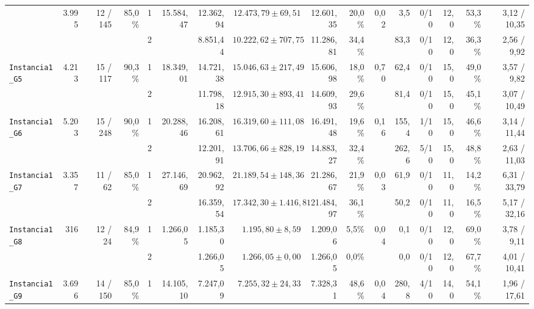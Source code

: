 {\begin{longtable}{lrrrcrrrrrrrrrrr}
\midrule
\rowcolor{gray!18}\multirow{2}{*}{\textbf{\texttt{Instancia1\_G4}}} & \multirow{2}{*}{3.995} & \multirow{2}{*}{12 / 145} & \multirow{2}{*}{85,0\%} & 1 & \multirow{2}{*}{15.584,47} & 12.362,94 & $12.473,79 \pm 69,51$ & 12.601,35 & 20,0\% & \multirow{2}{*}{0,02} & 3,5 & 0/10 & 12,0 & 53,3\% & 3,12 / 10,35 \\
\rowcolor{gray!18}& & & & 2 &  & 8.851,44 & $10.222,62 \pm 707,75$ & 11.286,81 & 34,4\% &  & 83,3 & 0/10 & 12,0 & 36,3\% & 2,56 / 9,92 \\
\midrule
\multirow{2}{*}{\texttt{Instancia1\_G5}} & \multirow{2}{*}{4.213} & \multirow{2}{*}{15 / 117} & \multirow{2}{*}{90,3\%} & 1 & \multirow{2}{*}{18.349,01} & 14.721,38 & $15.046,63 \pm 217,49$ & 15.606,98 & 18,0\% & \multirow{2}{*}{0,70} & 62,4 & 0/10 & 15,0 & 49,0\% & 3,57 / 9,82 \\
& & & & 2 &  & 11.798,18 & $12.915,30 \pm 893,41$ & 14.609,93 & 29,6\% &  & 81,4 & 0/10 & 15,0 & 45,1\% & 3,07 / 10,49 \\
\midrule
\multirow{2}{*}{\texttt{Instancia1\_G6}} & \multirow{2}{*}{5.203} & \multirow{2}{*}{15 / 248} & \multirow{2}{*}{90,0\%} & 1 & \multirow{2}{*}{20.288,46} & 16.208,61 & $16.319,60 \pm 111,08$ & 16.491,48 & 19,6\% & \multirow{2}{*}{0,16} & 155,4 & 1/10 & 15,0 & 46,6\% & 3,14 / 11,44 \\
& & & & 2 &  & 12.201,91 & $13.706,66 \pm 828,19$ & 14.883,27 & 32,4\% &  & 262,6 & 5/10 & 15,0 & 48,8\% & 2,63 / 11,03 \\
\midrule
\multirow{2}{*}{\texttt{Instancia1\_G7}} & \multirow{2}{*}{3.357} & \multirow{2}{*}{11 / 62} & \multirow{2}{*}{85,0\%} & 1 & \multirow{2}{*}{27.146,69} & 20.962,92 & $21.189,54 \pm 148,36$ & 21.286,67 & 21,9\% & \multirow{2}{*}{0,03} & 61,9 & 0/10 & 11,0 & 14,2\% & 6,31 / 33,79 \\
& & & & 2 &  & 16.359,54 & $17.342,30 \pm 1.416,81$ & 21.484,97 & 36,1\% &  & 50,2 & 0/10 & 11,0 & 16,5\% & 5,17 / 32,16 \\
\midrule
\multirow{2}{*}{\texttt{Instancia1\_G8}} & \multirow{2}{*}{316} & \multirow{2}{*}{12 / 24} & \multirow{2}{*}{84,9\%} & 1 & \multirow{2}{*}{1.266,05} & 1.185,30 & $1.195,80 \pm 8,59$ & 1.209,06 & 5,5\% & \multirow{2}{*}{0,04} & 0,1 & 0/10 & 12,0 & 69,0\% & 3,78 / 9,11 \\
& & & & 2 &  & 1.266,05 & $1.266,05 \pm 0,00$ & 1.266,05 & 0,0\% &  & 0,0 & 0/10 & 12,0 & 67,7\% & 4,01 / 10,41 \\
\midrule
\multirow{2}{*}{\texttt{Instancia1\_G9}} & \multirow{2}{*}{3.696} & \multirow{2}{*}{14 / 150} & \multirow{2}{*}{85,0\%} & 1 & \multirow{2}{*}{14.105,10} & 7.247,09 & $7.255,32 \pm 24,33$ & 7.328,31 & 48,6\% & \multirow{2}{*}{0,04} & 280,8 & 4/10 & 14,0 & 54,1\% & 1,96 / 17,61 \\

\end{longtable}}
